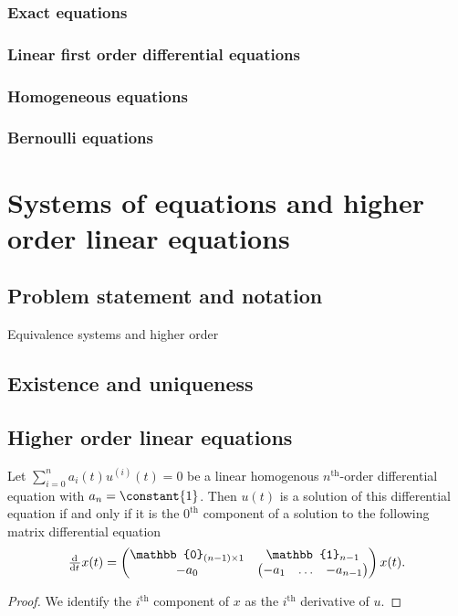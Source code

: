 \subsubsection{Exact equations}
\subsubsection{Linear first order differential equations}
\subsubsection{Homogeneous equations}
\subsubsection{Bernoulli equations}

\section{Systems of equations and higher order linear equations}
\subsection{Problem statement and notation}
Equivalence systems and higher order
\subsection{Existence and uniqueness}
\subsection{Higher order linear equations}

\begin{lemma} \label{higherOrderDifferentialEquationAsSystem}
Let $\sum_{i=0}^n a_i(t)u^{(i)}(t) = 0$ be a linear homogenous $n^\text{th}$-order differential equation with $a_n = \constant{1}$. Then $u(t)$ is a solution of this differential equation \textup{if and only if} it is the $0^{\text{th}}$ component of a solution to the following matrix differential equation
\[ \od{}{t}x(t) = \begin{pmatrix}
\mathbb{0}_{(n-1)\times 1} & \mathbb{1}_{n-1} \\
-a_{0} & \begin{pmatrix}
-a_{1} & \hdots & -a_{n-1}
\end{pmatrix}
\end{pmatrix}x(t). \]
\end{lemma}
\begin{proof}
We identify the $i^\text{th}$ component of $x$ as the $i^\text{th}$ derivative of $u$.
\end{proof}

